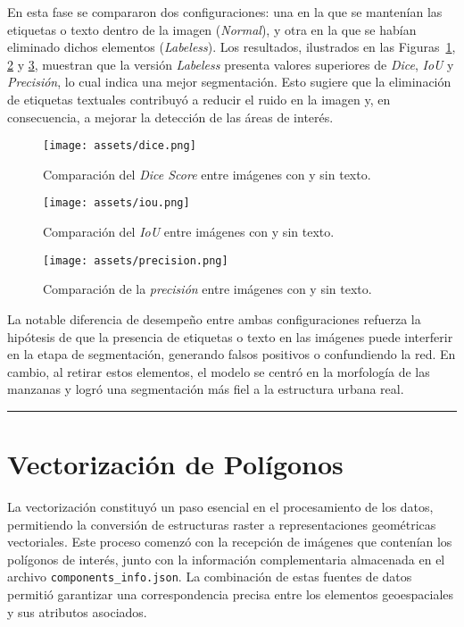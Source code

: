 \documentclass[twocolumn, fontsize=10pt]{article}
\begin{document}
En esta fase se compararon dos configuraciones: una en la que se manten\'ian las etiquetas o texto dentro de la imagen (\textit{Normal}), y otra en la que se hab\'ian eliminado dichos elementos (\textit{Labeless}). Los resultados, ilustrados en las Figuras~\ref{fig:dice}, \ref{fig:iou} y \ref{fig:precision}, muestran que la versi\'on \textit{Labeless} presenta valores superiores de \textit{Dice}, \textit{IoU} y \textit{Precisi\'on}, lo cual indica una mejor segmentaci\'on. Esto sugiere que la eliminaci\'on de etiquetas textuales contribuy\'o a reducir el ruido en la imagen y, en consecuencia, a mejorar la detecci\'on de las \'areas de inter\'es.

\begin{figure}[H]
    \centering
    \texttt{[image: assets/dice.png]}
    \caption{Comparaci\'on del \textit{Dice Score} entre im\'agenes con y sin texto.}
    \label{fig:dice}
\end{figure}

\begin{figure}[H]
    \centering
    \texttt{[image: assets/iou.png]}
    \caption{Comparaci\'on del \textit{IoU} entre im\'agenes con y sin texto.}
    \label{fig:iou}
\end{figure}

\begin{figure}[H]
    \centering
    \texttt{[image: assets/precision.png]}
    \caption{Comparaci\'on de la \textit{precisi\'on} entre im\'agenes con y sin texto.}
    \label{fig:precision}
\end{figure}

La notable diferencia de desempe\~no entre ambas configuraciones refuerza la hip\'otesis de que la presencia de etiquetas o texto en las im\'agenes puede interferir en la etapa de segmentaci\'on, generando falsos positivos o confundiendo la red. En cambio, al retirar estos elementos, el modelo se centr\'o en la morfolog\'ia de las manzanas y logr\'o una segmentaci\'on m\'as fiel a la estructura urbana real.


\rule{\linewidth}{0.5pt}
\section{Vectorización de Polígonos}


La vectorización constituyó un paso esencial en el procesamiento de los datos, permitiendo la conversión de estructuras raster a representaciones geométricas vectoriales. Este proceso comenzó con la recepción de imágenes que contenían los polígonos de interés, junto con la información complementaria almacenada en el archivo \texttt{components\_info.json}. La combinación de estas fuentes de datos permitió garantizar una correspondencia precisa entre los elementos geoespaciales y sus atributos asociados.\\
\end{document}
